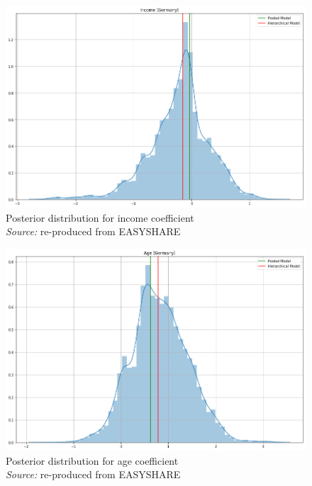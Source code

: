 \begin{figure}[H]
\centering
\includegraphics[scale=.3]{images/bayesian/download-36.png}
            \captionsetup{justification=centering}
    \caption{Posterior distribution for income coefficient \\
    \textit{Source:} re-produced from EASYSHARE}
    \label{fig:age_distr_germany}
\end{figure}


\begin{figure}[H]
\centering
\includegraphics[scale=.3]{images/bayesian/download-37.png}
            \captionsetup{justification=centering}
    \caption{Posterior distribution for age coefficient \\
    \textit{Source:} re-produced from EASYSHARE}
    \label{fig:age_distr_germany}
\end{figure}

